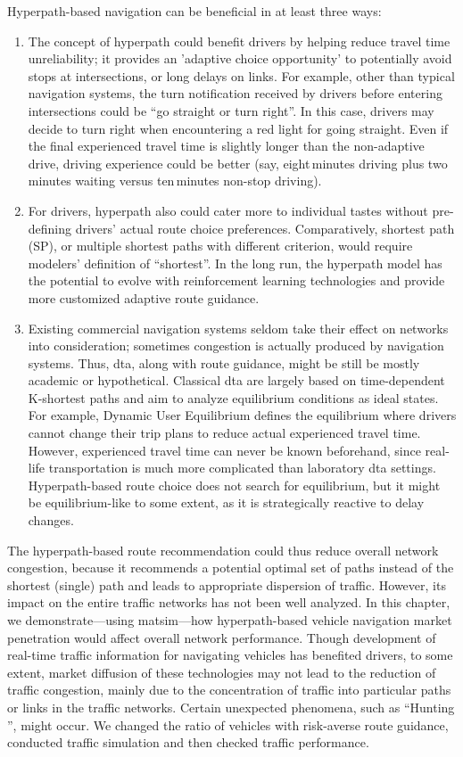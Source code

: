 Hyperpath-based navigation can be beneficial in at least three ways: 
\begin{enumerate}
\item The concept of hyperpath could benefit drivers by helping reduce travel time unreliability; it provides an 'adaptive choice opportunity' to potentially avoid stops at intersections, or long delays on links. For example, other than typical navigation systems, the turn notification received by drivers before entering intersections could be ``go straight or turn right''. In this case, drivers may decide to turn right when encountering a red light for going straight. Even if the final experienced travel time is slightly longer than the non-adaptive drive, driving experience could be better (say, eight\,minutes driving plus two\,minutes waiting versus ten\,minutes non-stop driving).
\item For drivers, hyperpath also could cater more to individual tastes without pre-defining drivers' actual route choice preferences. Comparatively, shortest path (SP), or multiple shortest paths with different criterion, would require modelers' definition of ``shortest''. In the long run, the hyperpath model has the potential to evolve with reinforcement learning technologies and provide more customized adaptive route guidance.
\item Existing commercial navigation systems seldom take their effect on networks into consideration; sometimes congestion is actually produced by navigation systems. Thus, \gls{dta}, along with route guidance, might be still be mostly academic or hypothetical. Classical \gls{dta} are largely based on time-dependent K-shortest paths and aim to analyze equilibrium conditions as ideal states. For example, Dynamic User Equilibrium defines the equilibrium where drivers cannot change their trip plans to reduce actual experienced travel time. However, experienced travel time can never be known beforehand, since real-life transportation is much more complicated than laboratory \gls{dta} settings. Hyperpath-based route choice does not search for equilibrium, but it might be equilibrium-like to some extent, as it is strategically reactive to delay changes. 
\end{enumerate}

The hyperpath-based route recommendation could thus reduce overall network congestion, because it recommends a potential optimal set of paths instead of the shortest (single) path and leads to appropriate dispersion of traffic. However, its impact on the entire traffic networks has not been well analyzed. In this chapter, we demonstrate---using \gls{matsim}---how hyperpath-based vehicle navigation market penetration would affect overall network performance.  Though development of real-time traffic information for navigating vehicles has benefited drivers, to some extent, market diffusion of these technologies may not lead to the reduction of traffic congestion, mainly due to the concentration of traffic into particular paths or links in the traffic networks. Certain unexpected phenomena, such as ``Hunting \citep[e.g.,][]{Oguchi2003}'', might occur. We changed the ratio of vehicles with risk-averse route guidance, conducted traffic simulation and then checked traffic performance.


